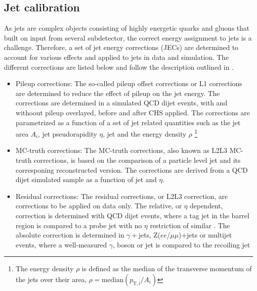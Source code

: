 \subsection{Jet calibration}
As jets are complex objects consisting of highly energetic quarks and gluons that built on input from several subdetector, the correct energy assignment to jets is a challenge. 
Therefore, a set of jet energy corrections (JECs) are determined to account for various effects and applied to jets in data and simulation. 
The different corrections are listed below and follow the description outlined in \cite{Khachatryan:2016kdb}. 
\begin{itemize}
\item Pileup corrections:
The so-called pileup offset corrections or L1 corrections are determined to reduce the effect of pileup on the jet energy. 
The corrections are determined in a simulated QCD dijet events, with and withoout pileup overlayed, before and after CHS applied. 
The corrections are parametrized as a function of a set of jet related quantities such as the jet area $A_{i}$, jet pseudorapidity $\eta$, jet \pt and the energy density $\rho$ \footnote{The energy density $\rho$ is defined as the median of the transverse momentum of the jets over their area, $\rho=\mathrm{median}(p_{\mathrm{T,i}}/ A_{i})$ } 
\item MC-truth corrections: 
The MC-truth corrections, also known as L2L3 MC-truth corrections, is based on the comparison of a particle level jet and its corresponing reconstructed version. 
The corrections are derived from a QCD dijet simulated sample as a function of jet \pt and $\eta$. 
\item Residual corrections:
The residual corrections, or L2L3 correction, are corrections to be applied on data only. 
The relative, or $\eta$ dependent, correction is determined with QCD dijet events, where a tag jet in the barrel region is compared to a probe jet with no $\eta$ restriction of similar \pt. 
The absolute correction is determined in $\gamma+$jets, Z($ee$/$\mu\mu$)+jets or multijet events, where a well-measured $\gamma$, \PZ boson or jet is compared to the recoiling jet 
\end{itemize}  
